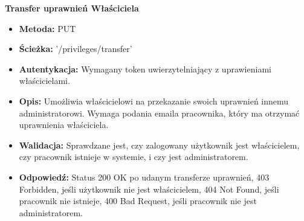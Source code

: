 \textbf{\large{Transfer uprawnień Właściciela}}
\begin{itemize}
    \item \textbf{Metoda:} PUT
    \item \textbf{Ścieżka:} '/privileges/transfer'
    \item \textbf{Autentykacja:} Wymagany token uwierzytelniający z uprawieniami właścicielami.
    \item \textbf{Opis:} Umożliwia właścicielowi na przekazanie swoich uprawnień innemu administratorowi. Wymaga podania emaila pracownika, który ma otrzymać uprawnienia właściciela.
    \item \textbf{Walidacja:}  Sprawdzane jest, czy zalogowany użytkownik jest właścicielem, czy pracownik istnieje w systemie, i czy jest administratorem.
    \item \textbf{Odpowiedź:}  Status 200 OK po udanym transferze uprawnień, 403 Forbidden, jeśli użytkownik nie jest właścicielem, 404 Not Found, jeśli pracownik nie istnieje, 400 Bad Request, jeśli pracownik nie jest administratorem.
\end{itemize}


